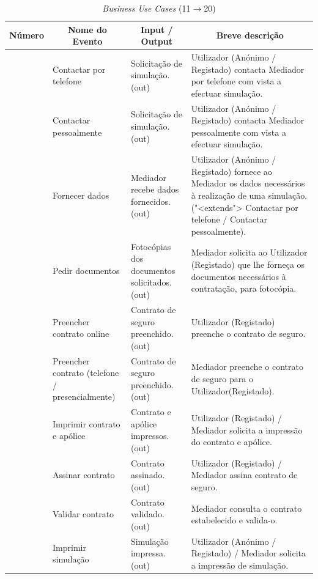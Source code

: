 \pagebreak
\begin{table}[!htb]
	\begin{center}
		\begin{tabular}{|c|p{3cm}|p{3cm}|p{5cm}|}
		\hline
		\multicolumn{1}{|c|}{\textbf{Número}} & \multicolumn{1}{|c|}{\textbf{Nome do Evento}} & \multicolumn{1}{|c|}{\textbf{Input / Output}} & \multicolumn{1}{|c|}{\textbf{Breve descrição}}\\
		\hline
		\T \B 11 & \footnotesize{Contactar por telefone} & \footnotesize{Solicitação de simulação. (out)} & \footnotesize{Utilizador (Anónimo / Registado) contacta Mediador por telefone com vista a efectuar simulação.}\\
		\hline
		\T \B 12 & \footnotesize{Contactar pessoalmente} & \footnotesize{Solicitação de simulação. (out)} & \footnotesize{Utilizador (Anónimo / Registado) contacta Mediador pessoalmente com vista a efectuar simulação.}\\
		\hline
		\T \B 13 & \footnotesize{Fornecer dados} & \footnotesize{Mediador recebe dados fornecidos. (out)} & \footnotesize{Utilizador (Anónimo / Registado) fornece ao Mediador os dados necessários à realização de uma simulação. ("<extends"> Contactar por telefone / Contactar pessoalmente).}\\
		\hline
		\T \B 14 & \footnotesize{Pedir documentos} & \footnotesize{Fotocópias dos documentos solicitados. (out)} & \footnotesize{Mediador solicita ao Utilizador (Registado) que lhe forneça os documentos necessários à contratação, para fotocópia.}\\
		\hline
		\T \B 15 & \footnotesize{Preencher contrato online} & \footnotesize{Contrato de seguro preenchido. (out)} & \footnotesize{Utilizador (Registado) preenche o contrato de seguro.}\\
		\hline
		\T \B 16 & \footnotesize{Preencher contrato (telefone / presencialmente)} & \footnotesize{Contrato de seguro preenchido. (out)} & \footnotesize{Mediador preenche o contrato de seguro para o Utilizador(Registado).}\\
		\hline
		\T \B 17 & \footnotesize{Imprimir contrato e apólice} & \footnotesize{Contrato e apólice impressos. (out)} & \footnotesize{Utilizador (Registado) / Mediador solicita a impressão do contrato e apólice.}\\
		\hline
		\T \B 18 & \footnotesize{Assinar contrato} & \footnotesize{Contrato assinado. (out)} & \footnotesize{Utilizador (Registado) / Mediador assina contrato de seguro.}\\
		\hline
		\T \B 19 & \footnotesize{Validar contrato} & \footnotesize{Contrato validado. (out)} & \footnotesize{Mediador consulta o contrato estabelecido e valida-o.}\\
		\hline
		\T \B 20 & \footnotesize{Imprimir simulação} & \footnotesize{Simulação impressa. (out)} & \footnotesize{Utilizador (Anónimo / Registado) / Mediador solicita a impressão de simulação.}\\
		\hline
		\end{tabular}
		\caption{\emph{Business Use Cases} (11$\to$20)}
	\end{center}
\end{table}
\pagebreak

